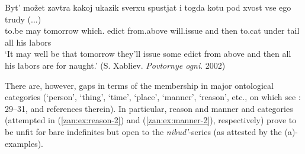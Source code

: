 \documentclass[output=paper,colorlinks,citecolor=brown]{langscibook}
\begin{document}
\ea \label{zan:ex:adj indf}\gll Byt' možet zavtra kakoj ukazik sverxu spustjat i togda kotu pod xvost vse ego trudy (...)\\
to.be may tomorrow which.{\INDF} edict from.above will.issue and then to.cat under tail all his labors\\
\glt `It may well be that tomorrow they'll issue some edict from above and then all his labors are for naught.' \hfill{(S. Xabliev. \textit{Povtornye ogni}. 2002)}
\z

\noindent There are, however, gaps in terms of the membership in major ontological categories (`person', `thing', `time', `place', `manner', `reason', etc., on which see \citealt{haspelmath1997indefinite}: 29--31, and references therein). In particular, reason and manner and categories (attempted in (\ref{zan:ex:reason-2}) and (\ref{zan:ex:manner-2}), respectively) prove to be unfit for bare indefinites but open to the \textit{nibud'}-series (as attested by the (a)-examples).

\ea \label{zan:ex:reason}
\z
\z

\ea \label{zan:ex:manner}
\z
\z
\end{document}
